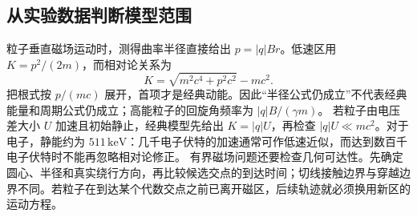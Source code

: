 \subsection{从实验数据判断模型范围}
粒子垂直磁场运动时，测得曲率半径直接给出 $p=|q|Br$。低速区用 $K=p^2/(2m)$，而相对论关系为
\[
 K=\sqrt{m^2c^4+p^2c^2}-mc^2.
\]
把根式按 $p/(mc)$ 展开，首项才是经典动能。因此“半径公式仍成立”不代表经典能量和周期公式仍成立；高能粒子的回旋角频率为 $|q|B/(\gamma m)$。
若粒子由电压差大小 $U$ 加速且初始静止，经典模型先给出 $K=|q|U$，再检查 $|q|U\ll mc^2$。对于电子，静能约为 $511\,\mathrm{keV}$：几千电子伏特的加速通常可作低速近似，而达到数百千电子伏特时不能再忽略相对论修正。
有界磁场问题还要检查几何可达性。先确定圆心、半径和真实绕行方向，再比较候选交点的到达时间；切线接触边界与穿越边界不同。若粒子在到达某个代数交点之前已离开磁区，后续轨迹就必须换用新区的运动方程。

